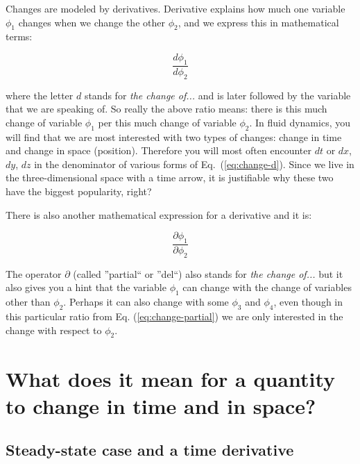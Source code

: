 


Changes are modeled by derivatives. Derivative explains how much one variable $\phi_1$ changes when we change the other $\phi_2$, and we express this in mathematical terms:

\begin{equation}\label{eq:change-d}
\frac{d \phi_1}{d \phi_2}
\end{equation}

where the letter $d$ stands for \textit{the change of...} and is later followed by the variable that we are speaking of. So really the above ratio means: there is this much change of variable $\phi_1$ per this much change of variable $\phi_2$. In fluid dynamics, you will find that we are most interested with two types of changes: change in time and change in space (position). Therefore you will most often encounter $dt$ or $dx$, $dy$, $dz$ in the denominator of various forms of Eq.~(\ref{eq:change-d}). Since we live in the three-dimensional space with a time arrow, it is justifiable why these two have the biggest popularity, right?

There is also another mathematical expression for a derivative and it is:

\begin{equation}\label{eq:change-partial}
\frac{\partial \phi_1}{\partial \phi_2}
\end{equation}

The operator $\partial$ (called ''partial`` or ''del``) also stands for \textit{the change of...} but it also gives you a hint that the variable $\phi_1$ can change with the change of variables other than $\phi_2$. Perhaps it can also change with some $\phi_3$ and $\phi_4$, even though in this particular ratio from Eq. (\ref{eq:change-partial}) we are only interested in the change with respect to $\phi_2$.

\section{What does it mean for a quantity to change in time and in space?}


\subsection{Steady-state case and a time derivative}

